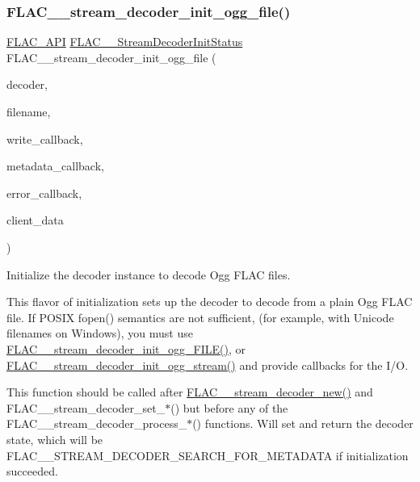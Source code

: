 \subsubsection{\texorpdfstring{FLAC\_\_stream\_decoder\_init\_ogg\_file()}{FLAC\_\_stream\_decoder\_init\_ogg\_file()}}
{\footnotesize\ttfamily \mbox{\hyperlink{group__flac__export_ga56ca07df8a23310707732b1c0007d6f5}{F\+L\+A\+C\+\_\+\+A\+PI}} \mbox{\hyperlink{group__flac__stream__decoder_gaaed54a24ac6310d29c5cafba79759c44}{F\+L\+A\+C\+\_\+\+\_\+\+Stream\+Decoder\+Init\+Status}} F\+L\+A\+C\+\_\+\+\_\+stream\+\_\+decoder\+\_\+init\+\_\+ogg\+\_\+file (\begin{DoxyParamCaption}\item[{\mbox{\hyperlink{struct_f_l_a_c_____stream_decoder}{F\+L\+A\+C\+\_\+\+\_\+\+Stream\+Decoder}} $\ast$}]{decoder,  }\item[{const char $\ast$}]{filename,  }\item[{\mbox{\hyperlink{group__flac__stream__decoder_ga61e48dc2c0d2f6c5519290ff046874a4}{F\+L\+A\+C\+\_\+\+\_\+\+Stream\+Decoder\+Write\+Callback}}}]{write\+\_\+callback,  }\item[{\mbox{\hyperlink{group__flac__stream__decoder_ga6aa87c01744c1c601b7f371f627b6e14}{F\+L\+A\+C\+\_\+\+\_\+\+Stream\+Decoder\+Metadata\+Callback}}}]{metadata\+\_\+callback,  }\item[{\mbox{\hyperlink{group__flac__stream__decoder_gac896ee6a12668e9015fab4fbc6aae996}{F\+L\+A\+C\+\_\+\+\_\+\+Stream\+Decoder\+Error\+Callback}}}]{error\+\_\+callback,  }\item[{\mbox{\hyperlink{_s_d_l__opengles2__gl2ext_8h_ae5d8fa23ad07c48bb609509eae494c95}{void}} $\ast$}]{client\+\_\+data }\end{DoxyParamCaption})}

Initialize the decoder instance to decode Ogg F\+L\+AC files.

This flavor of initialization sets up the decoder to decode from a plain Ogg F\+L\+AC file. If P\+O\+S\+IX fopen() semantics are not sufficient, (for example, with Unicode filenames on Windows), you must use \mbox{\hyperlink{group__flac__stream__decoder_gac6a35b1db07e057ec9912f637b37dd74}{F\+L\+A\+C\+\_\+\+\_\+stream\+\_\+decoder\+\_\+init\+\_\+ogg\+\_\+\+F\+I\+L\+E()}}, or \mbox{\hyperlink{group__flac__stream__decoder_ga78bf285b54e5aaee73a214c108683a72}{F\+L\+A\+C\+\_\+\+\_\+stream\+\_\+decoder\+\_\+init\+\_\+ogg\+\_\+stream()}} and provide callbacks for the I/O.

This function should be called after \mbox{\hyperlink{group__flac__stream__decoder_ga7159eefc074dfbab4a37462f69326091}{F\+L\+A\+C\+\_\+\+\_\+stream\+\_\+decoder\+\_\+new()}} and F\+L\+A\+C\+\_\+\+\_\+stream\+\_\+decoder\+\_\+set\+\_\+$\ast$() but before any of the F\+L\+A\+C\+\_\+\+\_\+stream\+\_\+decoder\+\_\+process\+\_\+$\ast$() functions. Will set and return the decoder state, which will be F\+L\+A\+C\+\_\+\+\_\+\+S\+T\+R\+E\+A\+M\+\_\+\+D\+E\+C\+O\+D\+E\+R\+\_\+\+S\+E\+A\+R\+C\+H\+\_\+\+F\+O\+R\+\_\+\+M\+E\+T\+A\+D\+A\+TA if initialization succeeded.

